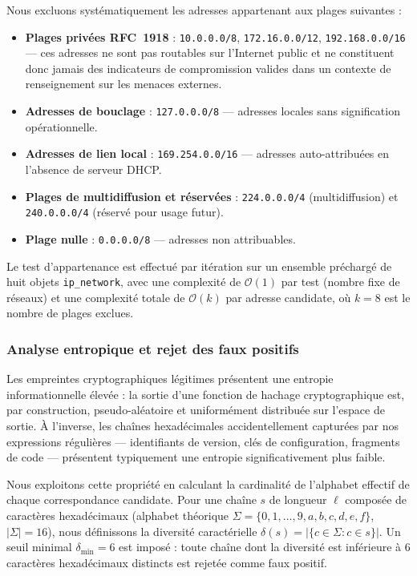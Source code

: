 Nous excluons systématiquement les adresses appartenant aux plages suivantes :

\begin{itemize}
    \item \textbf{Plages privées RFC~1918} : \texttt{10.0.0.0/8}, \texttt{172.16.0.0/12}, \texttt{192.168.0.0/16} --- ces adresses ne sont pas routables sur l'Internet public et ne constituent donc jamais des indicateurs de compromission valides dans un contexte de renseignement sur les menaces externes.
    \item \textbf{Adresses de bouclage} : \texttt{127.0.0.0/8} --- adresses locales sans signification opérationnelle.
    \item \textbf{Adresses de lien local} : \texttt{169.254.0.0/16} --- adresses auto-attribuées en l'absence de serveur DHCP.
    \item \textbf{Plages de multidiffusion et réservées} : \texttt{224.0.0.0/4} (multidiffusion) et \texttt{240.0.0.0/4} (réservé pour usage futur).
    \item \textbf{Plage nulle} : \texttt{0.0.0.0/8} --- adresses non attribuables.
\end{itemize}

Le test d'appartenance est effectué par itération sur un ensemble préchargé de huit objets \texttt{ip\_network}, avec une complexité de $\mathcal{O}(1)$ par test (nombre fixe de réseaux) et une complexité totale de $\mathcal{O}(k)$ par adresse candidate, où $k = 8$ est le nombre de plages exclues.

\subsubsection{Analyse entropique et rejet des faux positifs}

Les empreintes cryptographiques légitimes présentent une entropie informationnelle élevée : la sortie d'une fonction de hachage cryptographique est, par construction, pseudo-aléatoire et uniformément distribuée sur l'espace de sortie. À l'inverse, les chaînes hexadécimales accidentellement capturées par nos expressions régulières --- identifiants de version, clés de configuration, fragments de code --- présentent typiquement une entropie significativement plus faible.

Nous exploitons cette propriété en calculant la cardinalité de l'alphabet effectif de chaque correspondance candidate. Pour une chaîne $s$ de longueur $\ell$ composée de caractères hexadécimaux (alphabet théorique $\Sigma = \{0, 1, \ldots, 9, a, b, c, d, e, f\}$, $|\Sigma| = 16$), nous définissons la diversité caractérielle $\delta(s) = |\{c \in \Sigma : c \in s\}|$. Un seuil minimal $\delta_{\min} = 6$ est imposé : toute chaîne dont la diversité est inférieure à 6 caractères hexadécimaux distincts est rejetée comme faux positif.

